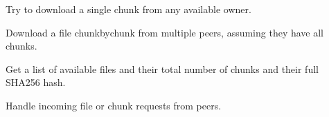 \documentclass[letterpaper,10pt,english]{sphinxmanual}
\begin{document}
\begin{fulllineitems}
\label{\detokenize{main:main.download_chunk}}
\pysigstartsignatures
\pysiglinewithargsret
{}
{\sphinxparamcomma {}\sphinxparamcomma {}\sphinxparamcomma {}\sphinxparamcomma {}}
{}
\pysigstopsignatures
\sphinxAtStartPar
Try to download a single chunk from any available owner.

\end{fulllineitems}


\begin{fulllineitems}
\label{\detokenize{main:main.download_file}}
\pysigstartsignatures
\pysiglinewithargsret
{}
{}
{}
\pysigstopsignatures
\sphinxAtStartPar
Download a file chunk\sphinxhyphen{}by\sphinxhyphen{}chunk from multiple peers, assuming they have all chunks.

\end{fulllineitems}


\begin{fulllineitems}
\label{\detokenize{main:main.get_my_files}}
\pysigstartsignatures
\pysiglinewithargsret
{}
{}
{}
\pysigstopsignatures
\sphinxAtStartPar
Get a list of available files and their total number of chunks and their full SHA\sphinxhyphen{}256 hash.

\end{fulllineitems}


\begin{fulllineitems}
\label{\detokenize{main:main.handle_client}}
\pysigstartsignatures
\pysiglinewithargsret
{}
{\sphinxparamcomma {}}
{}
\pysigstopsignatures
\sphinxAtStartPar
Handle incoming file or chunk requests from peers.

\end{fulllineitems}
\end{document}
